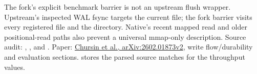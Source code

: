 The fork's explicit benchmark barrier is not an upstream flush wrapper. Upstream's inspected WAL fsync targets the current file; the fork barrier visits every registered file and the directory. Native's recent mapped read and older positional-read paths also prevent a universal mmap-only description. Source audit: , , and . Paper: \href{https://arxiv.org/abs/2602.01873}{Chursin et al., arXiv:2602.01873v2}, write flow/durability and evaluation sections.  stores the parsed source matches for the throughput values.
